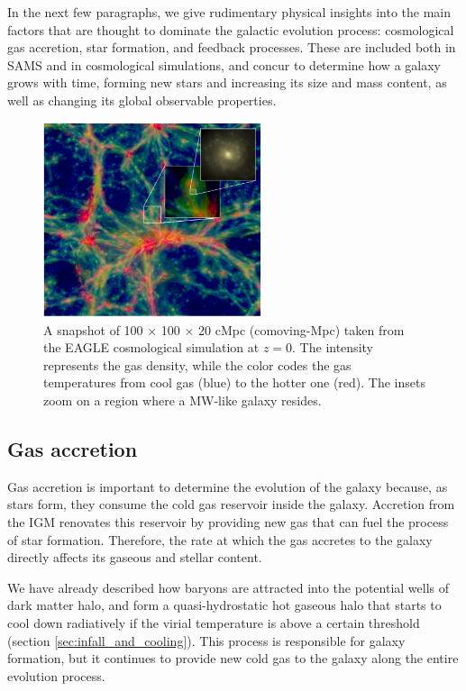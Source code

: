  In the next few paragraphs, we give rudimentary physical insights into the main factors that are thought to dominate the galactic evolution process: cosmological gas accretion, star formation, and feedback processes. These are included both in SAMS and in cosmological simulations, and concur to determine how a galaxy grows with time, forming new stars and increasing its size and mass content, as well as changing its global observable properties. 
 
 
\begin{figure}
	\centering
	\includegraphics[width=0.57\textwidth]{plots/eagle.PNG}
	\caption{A snapshot of 100 × 100 × 20 cMpc (comoving-Mpc) taken from the EAGLE cosmological simulation \citep{schaye2015} at $z=0$. The intensity represents the gas density, while the color codes the gas temperatures from cool gas (blue) to the hotter one (red). The insets zoom on a region where a MW-like galaxy resides. 
	}
	\label{fig:eagle}
    \end{figure}
    
    
  \subsection{Gas accretion} \label{sec:accretion}
  
  Gas accretion is important to determine the evolution of the galaxy because, as stars form, they consume the cold gas reservoir inside the galaxy. Accretion from the IGM renovates this reservoir by providing new gas that can fuel the process of star formation. Therefore, the rate at which the gas accretes to the galaxy directly affects its gaseous and stellar content. 
  
  We have already described how baryons are attracted into the potential wells of dark matter halo, and form a quasi-hydrostatic hot gaseous halo that starts to cool down radiatively if the virial temperature is above a certain threshold (section \ref{sec:infall_and_cooling}). This process is responsible for galaxy formation, but it continues to provide new cold gas to the galaxy along the entire evolution process. 
  

